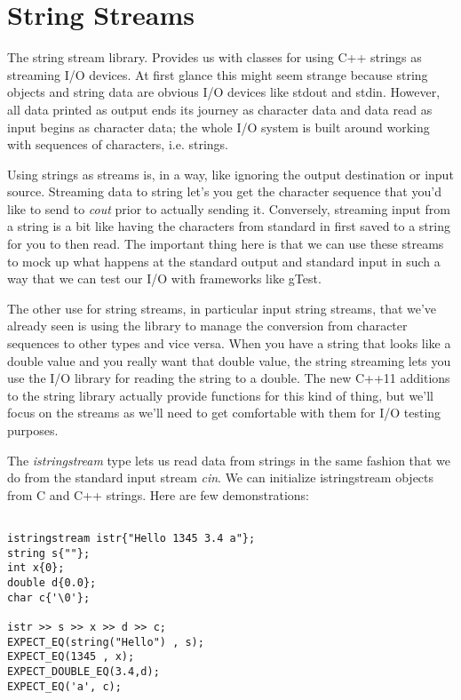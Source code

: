 \documentclass[]{tufte-handout}
\begin{document}
\section{String Streams}


The string stream library.  Provides us with classes for using C++ strings as streaming I/O devices. At first glance this might seem strange because string objects and string data are obvious I/O devices like stdout and stdin. However, all data printed as output ends its journey as character data and data read as input begins as character data; the whole I/O system is built around working with sequences of characters, i.e. strings.

Using strings as streams is, in a way, like ignoring the output destination or input source. Streaming data to string let's you get the character sequence that you'd like to send to \textit{cout} prior to actually sending it.  Conversely, streaming input from a string is a bit like having the characters from standard in first saved to a string for you to then read.  The important thing here is that we can use these streams to mock up what happens at the standard output and standard input in such a way that we can test our I/O with frameworks like gTest. 

The other use for string streams, in particular input string streams, that we've already seen is using the library to manage the conversion from character sequences to other types and vice versa. When you have a string that looks like a double value and you really want that double value, the string streaming lets you use the I/O library for reading the string to a double. The new C++11 additions to the string library actually provide functions for this kind of thing, but we'll focus on the streams as we'll need to get comfortable with them for I/O testing purposes. 

The \textit{istringstream} type lets us read data from strings in the same fashion that we do from the standard input stream \textit{cin}. We can initialize istringstream objects from C and C++ strings. Here are few demonstrations:
\begin{verbatim}

istringstream istr{"Hello 1345 3.4 a"};
string s{""};
int x{0};
double d{0.0};
char c{'\0'};

istr >> s >> x >> d >> c;
EXPECT_EQ(string("Hello") , s);
EXPECT_EQ(1345 , x);
EXPECT_DOUBLE_EQ(3.4,d);
EXPECT_EQ('a', c);
\end{verbatim}
\end{document}
